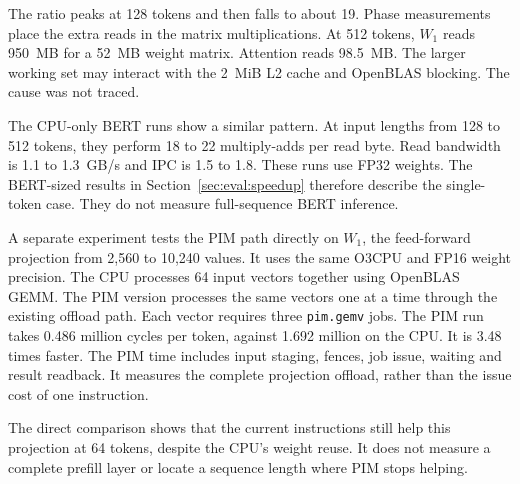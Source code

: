 The ratio peaks at 128 tokens and then falls to about 19. Phase measurements
place the extra reads in the matrix multiplications. At 512 tokens,
$W_1$ reads 950~MB for a 52~MB weight matrix. Attention reads 98.5~MB.
The larger working set may interact with the 2~MiB L2 cache and OpenBLAS
blocking. The cause was not traced.

The CPU-only BERT runs show a similar pattern. At input lengths from 128
to 512 tokens, they perform 18 to 22 multiply-adds per read byte. Read
bandwidth is 1.1 to 1.3~GB/s and IPC is 1.5 to 1.8. These runs use FP32
weights. The BERT-sized results in Section~\ref{sec:eval:speedup} therefore
describe the single-token case. They do not measure full-sequence BERT
inference.

A separate experiment tests the PIM path directly on $W_1$, the feed-forward
projection from 2,560 to 10,240 values. It uses the same O3CPU and FP16 weight
precision. The CPU processes 64 input vectors together using OpenBLAS GEMM.
The PIM version processes the same vectors one at a time through the existing
offload path. Each vector requires three \texttt{pim.gemv} jobs. The PIM run
takes 0.486 million cycles per token, against 1.692 million on the CPU.
It is 3.48 times faster. The PIM time includes input staging, fences,
job issue, waiting and result readback. It measures the complete projection
offload, rather than the issue cost of one instruction.

The direct comparison shows that the current instructions still help this
projection at 64 tokens, despite the CPU's weight reuse. It does not measure
a complete prefill layer or locate a sequence length where PIM stops helping.

